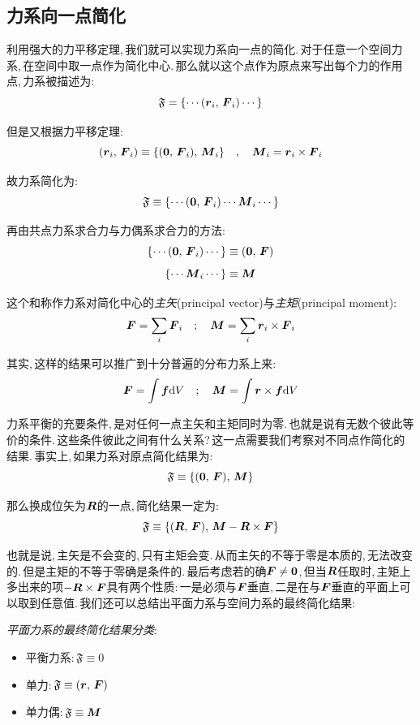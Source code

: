 \vspace{1.2cm}

\subsection{力系向一点简化}

利用强大的力平移定理,\,我们就可以实现力系向一点的简化.\,对于任意一个空间力系,\,在空间中取一点作为简化中心.\,那么就以这个点作为原点来写出每个力的作用点,\,力系被描述为:
\[\mathfrak{F}=\{\cdots(\boldsymbol{r}_i,\,\boldsymbol{F}_i)\cdots\}\]

但是又根据力平移定理:
\[(\boldsymbol{r}_i,\,\boldsymbol{F}_i)\equiv\{(\boldsymbol{0},\,\boldsymbol{F}_i),\,\boldsymbol{M}_i\}\quad,\quad \boldsymbol{M}_i=\boldsymbol{r}_i\times\boldsymbol{F}_i\]

故力系简化为:
\[\mathfrak{F}\equiv\{\cdots(\boldsymbol{0},\,\boldsymbol{F}_i)\cdots\boldsymbol{M}_i\cdots\}\]

再由共点力系求合力与力偶系求合力的方法:
\[\{\cdots(\boldsymbol{0},\,\boldsymbol{F}_i)\cdots\}\equiv(\boldsymbol{0},\,\boldsymbol{F})\]
\[\{\cdots\boldsymbol{M}_i\cdots\}\equiv\boldsymbol{M}\]

这个和称作力系对简化中心的\emph{主矢}(principal vector)与\emph{主矩}(principal moment):
\[\boldsymbol{F}=\sum_i\boldsymbol{F}_i\quad;\quad \boldsymbol{M}=\sum_i\boldsymbol{r}_i\times\boldsymbol{F}_i\]

其实,\,这样的结果可以推广到十分普遍的分布力系上来:
\[\boldsymbol{F}=\int\boldsymbol{f}\textrm{d} V\quad;\quad\boldsymbol{M}=\int\boldsymbol{r}\times\boldsymbol{f}\textrm{d} V\]

力系平衡的充要条件,\,是对任何一点主矢和主矩同时为零.\,也就是说有无数个彼此等价的条件.\,这些条件彼此之间有什么关系?\,这一点需要我们考察对不同点作简化的结果.\,事实上,\,如果力系对原点简化结果为:
\[\mathfrak{F}\equiv\{(\boldsymbol{0},\,\boldsymbol{F}),\,\boldsymbol{M}\}\]

那么换成位矢为$\boldsymbol{R}$的一点,\,简化结果一定为:
\[\mathfrak{F}\equiv\{(\boldsymbol{R},\,\boldsymbol{F}),\,\boldsymbol{M}-\boldsymbol{R}\times\boldsymbol{F}\}\]

也就是说,\,主矢是不会变的,\,只有主矩会变.\,从而主矢的不等于零是本质的,\,无法改变的.\,但是主矩的不等于零确是条件的.\,最后考虑若的确$\boldsymbol{F}\neq \boldsymbol{0}$,\,但当$\boldsymbol{R}$任取时,\,主矩上多出来的项$-\boldsymbol{R}\times\boldsymbol{F}$具有两个性质:\,一是必须与$\boldsymbol{F}$垂直,\,二是在与$\boldsymbol{F}$垂直的平面上可以取到任意值.\,我们还可以总结出平面力系与空间力系的最终简化结果:

\vspace{0.5cm}

\emph{平面力系的最终简化结果分类}:
\begin{itemize}
  \item 平衡力系:\,$\mathfrak{F}\equiv\mathfrak{0}$
  \item 单力:\,$\mathfrak{F}\equiv(\boldsymbol{r},\,\boldsymbol{F})$
  \item 单力偶:\,$\mathfrak{F}\equiv\boldsymbol{M}$
\end{itemize}

